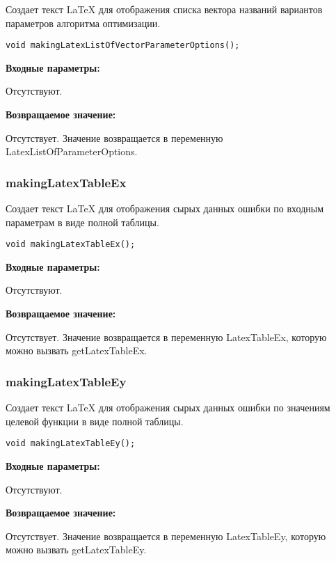 Создает текст LaTeX для отображения списка вектора названий вариантов параметров алгоритма оптимизации.


\begin{lstlisting}[label=code_syntax_makingLatexListOfVectorParameterOptions,caption=Синтаксис]
void makingLatexListOfVectorParameterOptions();
\end{lstlisting}

\textbf{Входные параметры:}

Отсутствуют.

\textbf{Возвращаемое значение:}

Отсутствует. Значение возвращается в переменную LatexListOfParameterOptions.


\subsubsection{makingLatexTableEx}\label{makingLatexTableEx}

Создает текст LaTeX для отображения сырых данных ошибки по входным параметрам в виде полной таблицы.


\begin{lstlisting}[label=code_syntax_makingLatexTableEx,caption=Синтаксис]
void makingLatexTableEx();
\end{lstlisting}

\textbf{Входные параметры:}

Отсутствуют.

\textbf{Возвращаемое значение:}

Отсутствует. Значение возвращается в переменную LatexTableEx, которую можно вызвать getLatexTableEx.


\subsubsection{makingLatexTableEy}\label{makingLatexTableEy}

Создает текст LaTeX для отображения сырых данных ошибки по значениям целевой функции в виде полной таблицы.


\begin{lstlisting}[label=code_syntax_makingLatexTableEy,caption=Синтаксис]
void makingLatexTableEy();
\end{lstlisting}

\textbf{Входные параметры:}

Отсутствуют.

\textbf{Возвращаемое значение:}

Отсутствует. Значение возвращается в переменную LatexTableEy, которую можно вызвать getLatexTableEy.


